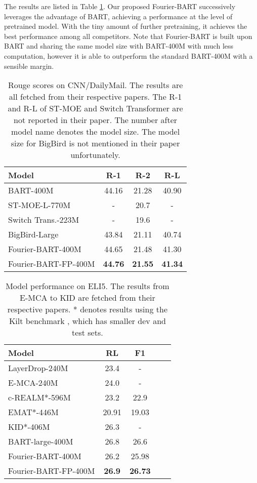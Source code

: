 \documentclass[11pt]{article}
\begin{document}
The results are listed in Table \ref{tab: cnn}. Our proposed Fourier-BART successively leverages the advantage of BART, achieving a performance at the level of pretrained model. With the tiny amount of further pretraining, it achieves the best performance among all competitors. Note that Fourier-BART is built upon BART and sharing the same model size with BART-400M with much less computation, however it is able to outperform the standard BART-400M with a sensible margin.


\begin{table}[ht]
\centering
\begin{tabular}{@{}lccc@{}}
\toprule
Model                           & R-1 & R-2 & R-L \\ \midrule
BART-400M                       & 44.16   & 21.28   & 40.90   \\ 
ST-MOE-L-770M                      & -       & 20.7    & -       \\ 
Switch Trans.-223M              & -       & 19.6    & -       \\ 
BigBird-Large                   & 43.84   & 21.11   & 40.74   \\ 
\midrule
Fourier-BART-400M      &  44.65   &  21.48       &   41.30      \\ 
Fourier-BART-FP-400M     &  \textbf{44.76}   &  \textbf{21.55}       &   \textbf{41.34}      \\\bottomrule
\end{tabular}
\caption{Rouge scores on CNN/DailyMail. The results are all fetched from their respective papers. The R-1 and R-L of ST-MOE and Switch Transformer are not reported in their paper. The number after model name denotes the model size. The model size for BigBird is not mentioned in their paper unfortunately.}
\label{tab: cnn}
\end{table}

\begin{table}[ht]
\centering
\begin{tabular}{@{}lcccc@{}}
\toprule
Model                                    & RL & F1 \\ \midrule
LayerDrop-240M      & 23.4   & -   \\
E-MCA-240M               & 24.0   & -   \\
c-REALM*-596M      & 23.2    & 22.9   \\
EMAT*-446M            & 20.91   & 19.03   \\
KID*-406M            & 26.3   & -   \\
BART-large-400M                               & 26.8   & 26.6   \\
\midrule
Fourier-BART-400M                                    & 26.2   & 25.98   \\
Fourier-BART-FP-400M                          & \textbf{26.9}   & \textbf{26.73}   \\ \bottomrule
\end{tabular}
\caption{Model performance on ELI5. The results from E-MCA to KID are fetched from their respective papers. * denotes results using the Kilt benchmark \citep{petroni2020kilt}, which has smaller dev and test sets.}
\label{tab: eli5}
\end{table}
\end{document}

